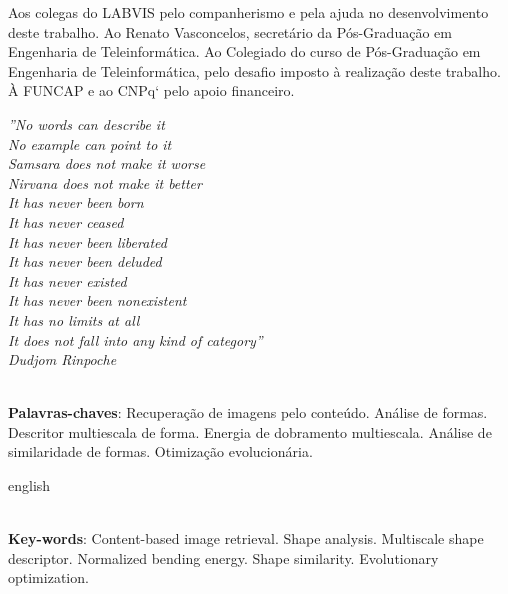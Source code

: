 \documentclass[
	12pt,				%
	openright,			%
	twoside,			%
	a4paper,			%
	english,			%
  	brazil				%
	]{abntex2}
\begin{document}
\begin{agradecimentos}
Aos colegas do LABVIS pelo companherismo e pela ajuda no desenvolvimento deste trabalho.
Ao Renato Vasconcelos, secretário da Pós-Graduação em Engenharia de Teleinformática.
Ao Colegiado do curso de Pós-Graduação em Engenharia de Teleinformática, pelo desafio imposto à realização deste trabalho.
À FUNCAP e ao CNPq` pelo apoio financeiro.
\end{agradecimentos}

\begin{epigrafe}
    \vspace*{\fill}
	\begin{flushright}
		\textit{''No words can describe it\\
    No example can point to it\\
    Samsara does not make it worse\\
    Nirvana does not make it better\\
    It has never been born\\
    It has never ceased\\
    It has never been liberated\\
    It has never been deluded\\
    It has never existed\\
    It has never been nonexistent\\
    It has no limits at all\\
    It does not fall into any kind of category''\\
	Dudjom Rinpoche}
	\end{flushright}
\end{epigrafe}


\setlength{\absparsep}{18pt} %
\begin{resumo}

\vspace{\onelineskip}
\noindent\\ 
\textbf{Palavras-chaves}: 
 Recuperação de imagens pelo conteúdo. Análise de formas. Descritor multiescala de forma. Energia de dobramento multiescala. Análise de similaridade de formas.  Otimização evolucionária.  
\end{resumo}

\begin{resumo}[Abstract]
\begin{otherlanguage*}{english}
 
\vspace{\onelineskip}
\noindent\\ 
\textbf{Key-words}: 
Content-based image retrieval. Shape analysis. Multiscale shape descriptor. Normalized bending energy. Shape similarity.  Evolutionary optimization.  
 \end{otherlanguage*}
\end{resumo}
\end{document}
